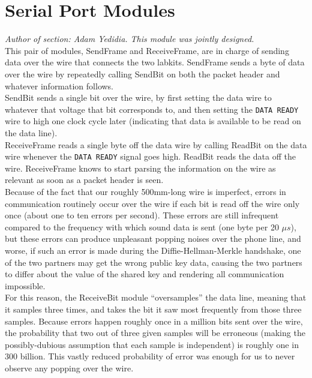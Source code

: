 \documentclass[a4paper]{report}
\begin{document}
\section{Serial Port Modules}

\emph{Author of section: Adam Yedidia. This module was jointly designed.} \\

This pair of modules, SendFrame and ReceiveFrame, are in charge of sending data over the wire that connects the two labkits. SendFrame sends a byte of data over the wire by repeatedly calling SendBit on both the packet header and whatever information follows. \\

SendBit sends a single bit over the wire, by first setting the data wire to whatever that voltage that bit corresponds to, and then setting the \verb|DATA READY| wire to high one clock cycle later (indicating that data is available to be read on the data line). \\

ReceiveFrame reads a single byte off the data wire by calling ReadBit on the data wire whenever the \verb|DATA READY| signal goes high. ReadBit reads the data off the wire. ReceiveFrame knows to start parsing the information on the wire as relevant as soon as a packet header is seen. \\

Because of the fact that our roughly 500mm-long wire is imperfect, errors in communication routinely occur over the wire if each bit is read off the wire only once (about one to ten errors per second). These errors are still infrequent compared to the frequency with which sound data is sent (one byte per 20 $\mu s$), but these errors can produce unpleasant popping noises over the phone line, and worse, if such an error is made during the Diffie-Hellman-Merkle handshake, one of the two partners may get the wrong public key data, causing the two partners to differ about the value of the shared key and rendering all communication impossible. \\

For this reason, the ReceiveBit module ``oversamples'' the data line, meaning that it samples three times, and takes the bit it saw most frequently from those three samples. Because errors happen roughly once in a million bits sent over the wire, the probability that two out of three given samples will %
 be erroneous (making the possibly-dubious assumption that each sample is independent) is roughly one in 300 billion. This vastly reduced probability of error was enough for us to never observe any popping over the wire.
\end{document}

